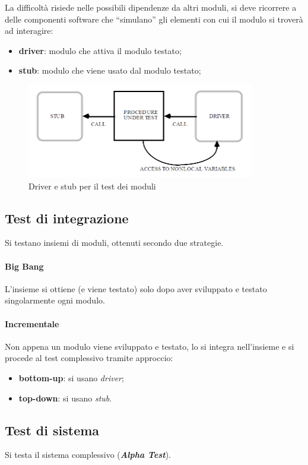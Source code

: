 La difficoltà risiede nelle possibili dipendenze da altri moduli, si deve ricorrere a delle componenti software che “simulano” gli elementi con cui il modulo si troverà ad interagire:
\begin{itemize}
    \item \textbf{driver}: modulo che attiva il modulo testato; 
    \item \textbf{stub}: modulo che viene usato dal modulo testato;
\end{itemize}

\begin{figure}[H]
    \centering
    \includegraphics[width=0.75\linewidth]{assets/driver-stub.png}
    \caption{Driver e stub per il test dei moduli}
    \label{fig:driver-stub}
\end{figure}

\subsection{Test di integrazione}
Si testano insiemi di moduli, ottenuti secondo due strategie.

\paragraph{Big Bang} L'insieme si ottiene (e viene testato) solo dopo aver sviluppato e testato singolarmente ogni modulo.

\paragraph{Incrementale} Non appena un modulo viene sviluppato e testato, lo si integra nell'insieme e si procede al test complessivo tramite approccio:
\begin{itemize}
    \item \textbf{bottom-up}: si usano \textit{driver};
    \item \textbf{top-down}: si usano \textit{stub}.
\end{itemize}

\subsection{Test di sistema} Si testa il sistema complessivo (\textbf{\textit{Alpha Test}}).


